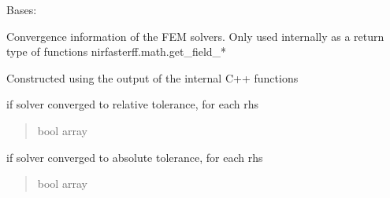 \documentclass[letterpaper,10pt,english]{sphinxmanual}
\begin{document}
\begin{fulllineitems}
\label{\detokenize{_autosummary/nirfasterff.utils.ConvergenceInfo:nirfasterff.utils.ConvergenceInfo}}
\pysigstartsignatures
{}
\pysigstopsignatures
\sphinxAtStartPar
Bases: 

\sphinxAtStartPar
Convergence information of the FEM solvers. Only used internally as a return type of functions nirfasterff.math.get\_field\_*

\sphinxAtStartPar
Constructed using the output of the internal C++ functions

\begin{fulllineitems}
\label{\detokenize{_autosummary/nirfasterff.utils.ConvergenceInfo:nirfasterff.utils.ConvergenceInfo.isConverged}}
\pysigstartsignatures
{}
\pysigstopsignatures
\sphinxAtStartPar
if solver converged to relative tolerance, for each rhs
\begin{quote}\begin{description}
\sphinxAtStartPar
bool array

\end{description}\end{quote}

\end{fulllineitems}


\begin{fulllineitems}
\label{\detokenize{_autosummary/nirfasterff.utils.ConvergenceInfo:nirfasterff.utils.ConvergenceInfo.isConvergedToAbsoluteTolerance}}
\pysigstartsignatures
{}
\pysigstopsignatures
\sphinxAtStartPar
if solver converged to absolute tolerance, for each rhs
\begin{quote}\begin{description}
\sphinxAtStartPar
bool array


\end{description}
\end{quote}
\end{fulllineitems}
\end{fulllineitems}
\end{document}
